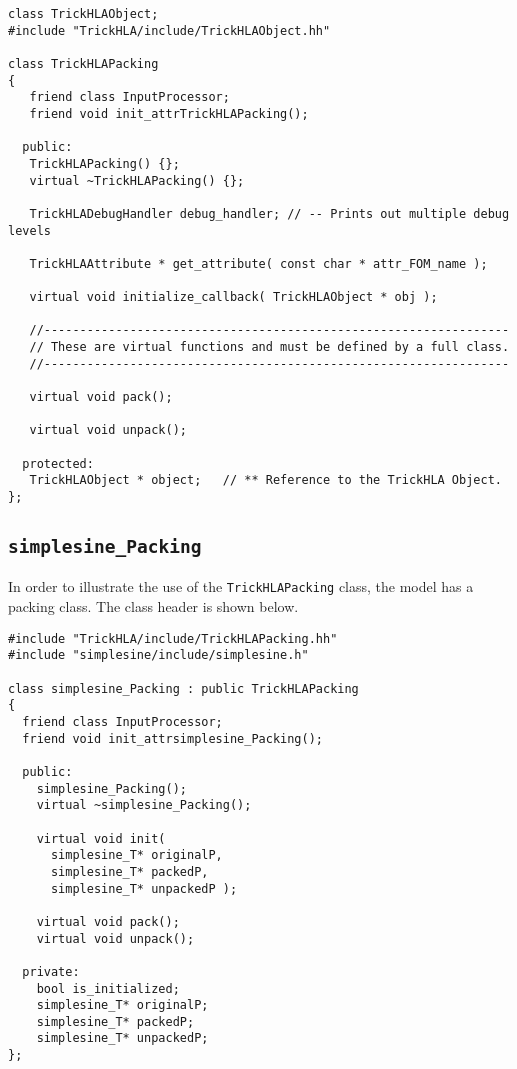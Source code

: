 \begin{lstlisting}[caption={{\tt TrickHLAPacking} class header}]
class TrickHLAObject;
#include "TrickHLA/include/TrickHLAObject.hh"

class TrickHLAPacking
{
   friend class InputProcessor;
   friend void init_attrTrickHLAPacking();

  public:
   TrickHLAPacking() {};
   virtual ~TrickHLAPacking() {};

   TrickHLADebugHandler debug_handler; // -- Prints out multiple debug levels

   TrickHLAAttribute * get_attribute( const char * attr_FOM_name );

   virtual void initialize_callback( TrickHLAObject * obj );

   //-----------------------------------------------------------------
   // These are virtual functions and must be defined by a full class.
   //-----------------------------------------------------------------

   virtual void pack();

   virtual void unpack();

  protected:
   TrickHLAObject * object;   // ** Reference to the TrickHLA Object.
};
\end{lstlisting}

\subsection{{\tt simplesine\_Packing}}

In order to illustrate the use of the {\tt TrickHLAPacking} class,
the \simplesine model has a packing class.
The class header is shown below.

\begin{lstlisting}[caption={{\tt simplesine\_Packing} class header}]
#include "TrickHLA/include/TrickHLAPacking.hh"
#include "simplesine/include/simplesine.h"

class simplesine_Packing : public TrickHLAPacking
{
  friend class InputProcessor;
  friend void init_attrsimplesine_Packing();

  public:
    simplesine_Packing();
    virtual ~simplesine_Packing();

    virtual void init(
      simplesine_T* originalP,
      simplesine_T* packedP,
      simplesine_T* unpackedP );

    virtual void pack();
    virtual void unpack();

  private:
    bool is_initialized;
    simplesine_T* originalP;
    simplesine_T* packedP;
    simplesine_T* unpackedP;
};
\end{lstlisting}

